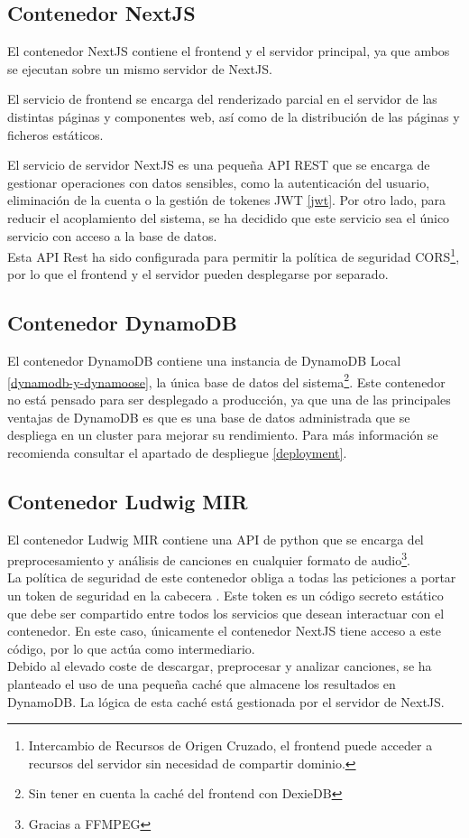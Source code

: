 \subsection{Contenedor NextJS}
El contenedor NextJS contiene el frontend y el servidor principal, ya que ambos se ejecutan sobre un mismo servidor de NextJS. 

El servicio de frontend se encarga del renderizado parcial en el servidor de las distintas páginas y componentes web, así como de la distribución de las páginas y ficheros estáticos.

El servicio de servidor NextJS es una pequeña API REST que se encarga de gestionar operaciones con datos sensibles, como la autenticación del usuario, eliminación de la cuenta o la gestión de tokenes JWT \ref{jwt}. Por otro lado, para reducir el acoplamiento del sistema, se ha decidido que este servicio sea el único servicio con acceso a la base de datos.\\
Esta API Rest ha sido configurada para permitir la política de seguridad CORS\footnote{Intercambio de Recursos de Origen Cruzado, el frontend puede acceder a recursos del servidor sin necesidad de compartir dominio.}, por lo que el frontend y el servidor pueden desplegarse por separado.


\subsection{Contenedor DynamoDB}
El contenedor DynamoDB contiene una instancia de DynamoDB Local \ref{dynamodb-y-dynamoose}, la única base de datos del sistema\footnote{Sin tener en cuenta la caché del frontend con DexieDB}. 
Este contenedor no está pensado para ser desplegado a producción, ya que una de las principales ventajas de DynamoDB es que es una base de datos administrada que se despliega en un cluster para mejorar su rendimiento. Para más información se recomienda consultar el apartado de despliegue \ref{deployment}.

\subsection{Contenedor Ludwig MIR}
El contenedor Ludwig MIR contiene una API de python que se encarga del preprocesamiento y análisis de canciones en cualquier formato de audio\footnote{Gracias a FFMPEG}.\\
La política de seguridad de este contenedor obliga a todas las peticiones a portar un token de seguridad en la cabecera  . Este token es un código secreto estático que debe ser compartido entre todos los servicios que desean interactuar con el contenedor. En este caso, únicamente el contenedor NextJS tiene acceso a este código, por lo que actúa como intermediario.\\
Debido al elevado coste de descargar, preprocesar y analizar canciones, se ha planteado el uso de una pequeña caché que almacene los resultados en DynamoDB. La lógica de esta caché está gestionada por el servidor de NextJS.


